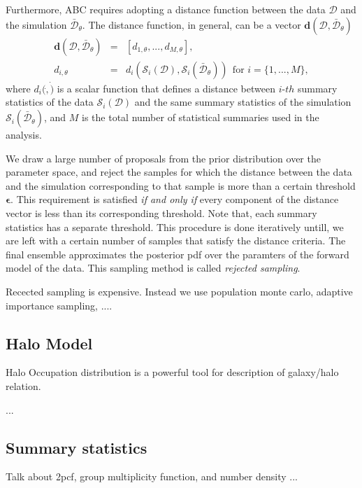 \documentclass[12pt, preprint]{aastex}
\begin{document}
Furthermore, ABC requires adopting a distance function between the data $\mathcal{D}$ and the simulation $\bar{\mathcal{D}}_{\theta}$.
The distance function, in general, can be a vector $\bm{d}(\mathcal{D},\bar{\mathcal{D}}_{\theta})$
\begin{eqnarray}
\bm{d}(\mathcal{D},\bar{\mathcal{D}}_{\theta}) &=& [d_{1,\theta}, ... , d_{M,\theta}], \\
d_{i,\theta} &=& d_{i}(\mathcal{S}_{i}(\mathcal{D}), \mathcal{S}_{i}(\bar{\mathcal{D}}_{\theta}))  ~~\mbox{for $i=\{1,...,M\}$},
\end{eqnarray}
where $d_{i}(\dot,\dot)$ is a scalar function that defines a distance 
between $i$-$th$ summary statistics of the data $\mathcal{S}_{i}(\mathcal{D})$ and the same summary statistics of 
the simulation $\mathcal{S}_{i}(\bar{\mathcal{D}}_{\theta})$, and $M$ is the total number of statistical summaries 
used in the analysis.

We draw a large number of proposals from the prior distribution over the parameter space, 
and reject the samples for which the distance between the data and the simulation corresponding to that 
sample is more than a certain threshold $\bm{\epsilon}$. This requirement is satisfied \emph{if and only if}
every component of the distance vector is less than its corresponding threshold. Note that, each summary statistics 
has a separate threshold. This procedure is done iteratively untill, we are left with a certain number
of samples that satisfy the distance criteria. The final ensemble approximates the posterior pdf over 
the paramters of the forward model of the data. This sampling method is called \emph{rejected sampling}.

Recected sampling is expensive. Instead we use population monte carlo, adaptive importance sampling, ....

\subsection{Halo Model}

Halo Occupation distribution is a powerful tool for description of galaxy/halo relation.

...

\subsection{Summary statistics}

Talk about 2pcf, group multiplicity function, and number density ...
\end{document}

